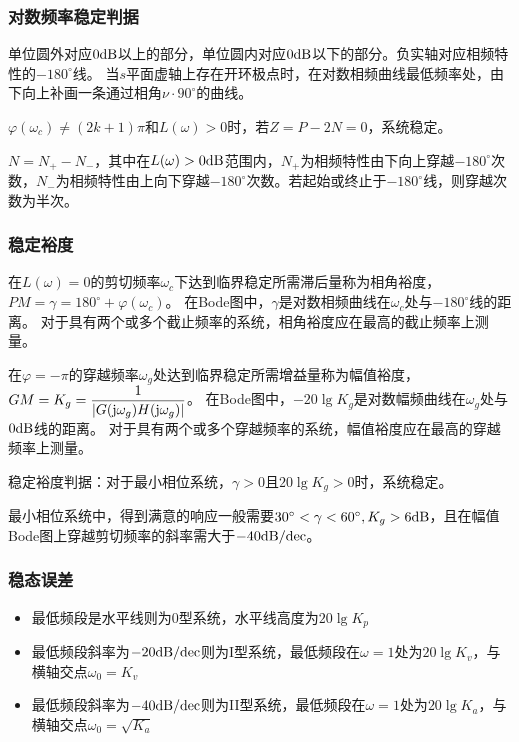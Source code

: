 \documentclass[11pt,a4paper]{ctexart}
\renewcommand{\j}{{\rm j}}
\begin{document}
        \subsubsection{对数频率稳定判据}
            单位圆外对应$0{\rm dB}$以上的部分，单位圆内对应$0{\rm dB}$以下的部分。负实轴对应相频特性的$-180^\circ$线。
            当$s$平面虚轴上存在开环极点时，在对数相频曲线最低频率处，由下向上补画一条通过相角$\nu\cdot90^\circ$的曲线。

            $\varphi(\omega_c)\neq(2k+1)\pi$和$L(\omega)>0$时，若$Z=P-2N=0$，系统稳定。

            $N=N_+-N_-$，其中在$L(\omega)>0{\rm dB}$范围内，$N_+$为相频特性由下向上穿越$-180^\circ$次数，$N_-$为相频特性由上向下穿越$-180^\circ$次数。若起始或终止于$-180^\circ$线，则穿越次数为半次。
        \subsubsection{稳定裕度}
            在$L(\omega)=0$的剪切频率$\omega_c$下达到临界稳定所需滞后量称为相角裕度，$PM=\gamma=180^\circ+\varphi(\omega_c)$。
            在Bode图中，$\gamma$是对数相频曲线在$\omega_c$处与$-180^\circ$线的距离。
            对于具有两个或多个截止频率的系统，相角裕度应在最高的截止频率上测量。

            在$\varphi=-\pi$的穿越频率$\omega_g$处达到临界稳定所需增益量称为幅值裕度，$GM=K_g=\dfrac{1}{|G(\j\omega_g)H(\j\omega_g)|}$。
            在Bode图中，$-20\lg K_g$是对数幅频曲线在$\omega_g$处与$0{\rm dB}$线的距离。
            对于具有两个或多个穿越频率的系统，幅值裕度应在最高的穿越频率上测量。

            稳定裕度判据：对于最小相位系统，$\gamma>0$且$20\lg K_g>0$时，系统稳定。

            最小相位系统中，得到满意的响应一般需要$30^\circ<\gamma<60^\circ,K_g>6{\rm dB}$，且在幅值Bode图上穿越剪切频率的斜率需大于$-40{\rm dB/dec}$。
        \subsubsection{稳态误差}
            \begin{itemize}
                \item 最低频段是水平线则为0型系统，水平线高度为$20\lg K_p$
                \item 最低频段斜率为$-20{\rm dB/dec}$则为I型系统，最低频段在$\omega=1$处为$20\lg K_v$，与横轴交点$\omega_0=K_v$
                \item 最低频段斜率为$-40{\rm dB/dec}$则为II型系统，最低频段在$\omega=1$处为$20\lg K_a$，与横轴交点$\omega_0=\sqrt{K_a}$
            \end{itemize}
\end{document}
